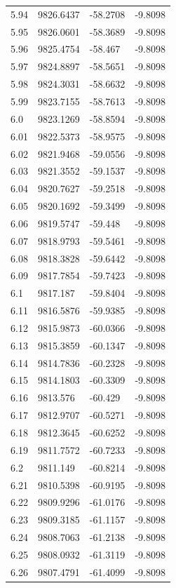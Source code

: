 \begin{table}[H]
\begin{tabular}{llll}
5.94 & 9826.6437 & -58.2708 & -9.8098 \\
5.95 & 9826.0601 & -58.3689 & -9.8098 \\
5.96 & 9825.4754 & -58.467 & -9.8098 \\
5.97 & 9824.8897 & -58.5651 & -9.8098 \\
5.98 & 9824.3031 & -58.6632 & -9.8098 \\
5.99 & 9823.7155 & -58.7613 & -9.8098 \\
6.0 & 9823.1269 & -58.8594 & -9.8098 \\
6.01 & 9822.5373 & -58.9575 & -9.8098 \\
6.02 & 9821.9468 & -59.0556 & -9.8098 \\
6.03 & 9821.3552 & -59.1537 & -9.8098 \\
6.04 & 9820.7627 & -59.2518 & -9.8098 \\
6.05 & 9820.1692 & -59.3499 & -9.8098 \\
6.06 & 9819.5747 & -59.448 & -9.8098 \\
6.07 & 9818.9793 & -59.5461 & -9.8098 \\
6.08 & 9818.3828 & -59.6442 & -9.8098 \\
6.09 & 9817.7854 & -59.7423 & -9.8098 \\
6.1 & 9817.187 & -59.8404 & -9.8098 \\
6.11 & 9816.5876 & -59.9385 & -9.8098 \\
6.12 & 9815.9873 & -60.0366 & -9.8098 \\
6.13 & 9815.3859 & -60.1347 & -9.8098 \\
6.14 & 9814.7836 & -60.2328 & -9.8098 \\
6.15 & 9814.1803 & -60.3309 & -9.8098 \\
6.16 & 9813.576 & -60.429 & -9.8098 \\
6.17 & 9812.9707 & -60.5271 & -9.8098 \\
6.18 & 9812.3645 & -60.6252 & -9.8098 \\
6.19 & 9811.7572 & -60.7233 & -9.8098 \\
6.2 & 9811.149 & -60.8214 & -9.8098 \\
6.21 & 9810.5398 & -60.9195 & -9.8098 \\
6.22 & 9809.9296 & -61.0176 & -9.8098 \\
6.23 & 9809.3185 & -61.1157 & -9.8098 \\
6.24 & 9808.7063 & -61.2138 & -9.8098 \\
6.25 & 9808.0932 & -61.3119 & -9.8098 \\
6.26 & 9807.4791 & -61.4099 & -9.8098 \\

\end{tabular}
\end{table}
